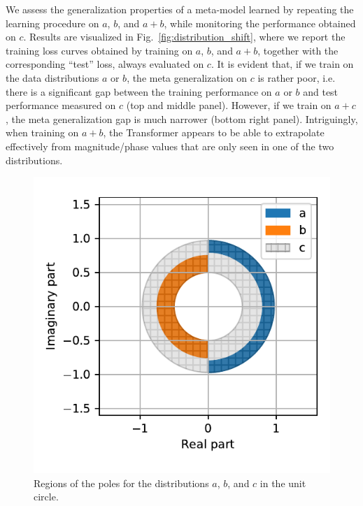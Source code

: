\documentclass{ifacconf}
\begin{document}
We assess the generalization properties of a meta-model learned  by repeating the learning procedure on $a$, $b$, and $a+b$, while monitoring the performance obtained on $c$.
Results are visualized in Fig.~\ref{fig:distribution_shift}, where we report the training loss curves obtained by training on $a$, $b$, and $a+b$, together with the corresponding ``test'' loss, always evaluated on $c$. It is evident that, if we train on the data distributions $a$ or $b$, the meta generalization on $c$ is rather poor, i.e. there is a significant gap between the training performance on $a$ or $b$ and test performance measured on $c$ (top and middle panel). However, if we train on $a + c$, the meta generalization gap is much narrower (bottom right panel).
Intriguingly, when training on $a+b$, the Transformer appears  to be able to extrapolate effectively from magnitude/phase values that are only seen in one of the two distributions.

\begin{figure}
\begin{center}
\includegraphics[width=.8\linewidth]{img/shift/pole_distribution.pdf}
\caption{Regions of the poles for the distributions $a$, $b$, and $c$ in the unit circle.}
\label{fig:pole_distribution}
\end{center}
\end{figure}
\end{document}
